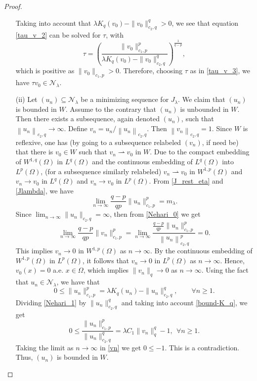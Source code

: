 \documentclass[pdflatex,sn-mathphys-num]{sn-jnl}
\theoremstyle{thmstyleone}%
\theoremstyle{thmstyletwo}%
\theoremstyle{thmstylethree}%
\theoremstyle{thmstylethree}%
\begin{document}
\begin{proof}
\begin{itemize}
Taking into account that $\lambda K_q(v_{0})-\|v_0\|_{c_2,q}^q>0$, we see that equation \eqref{tau_v_2} can be solved for $\tau$, with 
\begin{equation}\label{tau_v_3}
\tau=\left(\frac{\|v_0\|_{c_1,p}^p}{\lambda K_q(v_{0})-\|v_0\|_{c_2,q}^q}\right)^{\frac{1}{q-p}}
,
\end{equation}
which is positive as $\|v_{0}\|_{c_1,p}>0$. Therefore, choosing  $\tau$ as in \eqref{tau_v_3}, we have $\tau v_{0} \in \mathcal{N}_{\lambda}$.
\item[(ii)]  Let 
$\left(u_{n}\right) \subseteq \mathcal{N}_{\lambda}$ be a minimizing sequence for $J_{\lambda}$. We claim that $(u_{n}) $  is bounded in $W$. Assume to the contrary that $\left(u_{n}\right)$ is unbounded in $W$. Then there exists a subsequence, again denoted $\left(u_{n}\right)$, such that $\left\|u_{n}\right\|_{c_2,q} \rightarrow \infty$. 
Define $v_{n}=u_{n} /\left\|u_{n}\right\|_{c_2,q}.$ Then $\left\|v_{n}\right\|_{c_2,q}=1. $ Since $W$ is reflexive,  one has (by going to a subsequence relabeled $(v_n)$, if need be) that there is $v_{0} \in W$ such that $v_{n} \rightharpoonup v_{0}$ in $W$. Due to the compact embedding of $W^{1,q}(\Omega)$ in $ L^q(\Omega)$ and the continuous embedding of  $L^q(\Omega)$ into $L^p(\Omega)$, (for a subsequence similarly relabeled) $v_{n} \rightharpoonup v_{0}$ in $W^{1, p}(\Omega)$ and  $v_{n} \rightarrow v_{0}$ in $L^{q}(\Omega)$  and $v_{n} \rightarrow v_{0}$ in $L^{p}(\Omega)$.  From \eqref{J_rest_eta} and \eqref{Jlambda}, we have
\begin{equation}\label{Nehari_0}
    \lim_{n\to \infty}\frac{q-p}{q p} \|u_n\|_{c_1,p}^p= m_{\lambda}.
\end{equation}
Since $\displaystyle \lim_{n\to \infty} \|u_n\|_{c_2, q}=\infty$, then from \eqref{Nehari_0} we get 
\begin{equation*}
\lim_{n\to \infty}\frac{q-p}{q p} \|v_n\|_{c_1,p}^p=\lim_{n\to \infty}\frac{\frac{q-p}{q p} \|u_n\|_{c_1,p}^p} {\left\|u_{n}\right\|_{c_2,q}^p} = 0.
\end{equation*}
This implies $ v_n\to 0$ in $W^{1,p}(\Omega)$ as $n\to \infty$. By the continuous embedding of $W^{1,p}(\Omega)$ in $L^p(\Omega)$, it follows that $v_n \to 0$ in $L^p(\Omega)$ as $n\to \infty$. Hence, $v_0(x)=0$ a.e. $x\in \Omega$, which implies $\|v_{n}\|_{q}\to 0$  as $n\to \infty$.
Using the fact that  $u_n \in \mathcal{N}_\lambda$, we have that  
\begin{equation}\label{Nehari_1}0 \leqslant \|u_n \|_{c_1,p}^p=\lambda K_q(u_{n})-\|u_n \|_{c_2,q}^q , \qquad \forall n  \geqslant 1.  \end{equation}
Dividing \eqref{Nehari_1} by $\|u_n\|_{c_2,q}^q$ and taking into account  \eqref{bound-K_q}, we get
\begin{equation}\label{vn}
0 \leqslant \frac{\|u_n \|_{c_1,p}^p}{\|u_n\|_{c_2,q}^q}=\lambda C_1 \|v_{n}\|_{q}^{q}-1 ,\ \ \forall n \geqslant 1 .
\end{equation}
Taking the limit as  $n\to\infty$ in \eqref{vn}  we get $0\leqslant -1.$ This is a contradiction. Thus, $\left(u_{n}\right)$ is bounded in $W$.


\end{itemize}
\end{proof}
\end{document}
